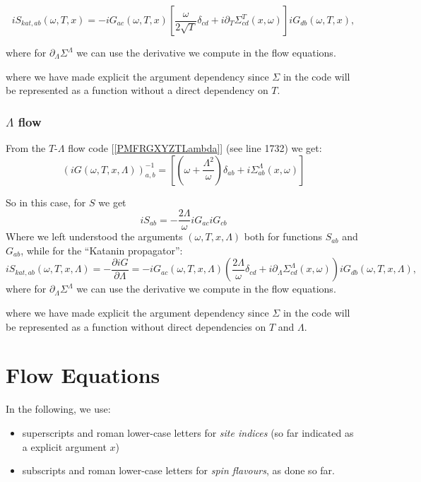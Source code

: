 \documentclass{article}
\begin{document}
\begin{equation}
  iS_{kat,ab}(\omega,T,x) = -iG_{ac}(\omega,T,x) \left[\frac{\omega}{2\sqrt{T}}\delta_{cd} + i\partial_T \Sigma^T_{cd}(x,\omega) \right]iG_{db}(\omega,T,x),
\end{equation}

where for $\partial_\Lambda \Sigma^\Lambda$ we can use the derivative we compute in the flow equations.



where we have made explicit the argument dependency
since $\Sigma$ in the code will be represented as a function
without a direct dependency on $T$.

\subsubsection{$\Lambda$ flow}

From the $T$-$\Lambda$ flow code [\ref{PMFRGXYZTLambda}] (see line 1732) we get:
\begin{equation}
  {(iG(\omega,T,x,\Lambda))}^{-1}_{a,b} = \left[\left(\omega+\frac{\Lambda^2}{\omega}\right) \delta_{ab} + i \Sigma^\Lambda_{ab}(x,\omega)\right]
\end{equation}

So in this case, for $S$ we get
\begin{equation}
iS_{ab} = - \frac{2\Lambda}{\omega} iG_{ac} iG_{cb}
\end{equation}
Where we left understood the arguments $(\omega,T,x,\Lambda)$ both for functions $S_{ab}$ and $G_{ab}$, while for the ``Katanin propagator'':
\begin{equation}
  iS_{kat,ab}(\omega,T,x,\Lambda) = - \frac{\partial iG}{\partial \Lambda} = - iG_{ac} (\omega,T,x,\Lambda)\left( \frac{2\Lambda}{\omega}\delta_{cd}  +i \partial_\Lambda \Sigma_{cd}^\Lambda(x,\omega)\right)iG_{db}(\omega,T,x,\Lambda),
\end{equation}
where for $\partial_\Lambda \Sigma^\Lambda$ we can use the derivative we compute in the flow equations.

where we have made explicit the argument dependency
since $\Sigma$ in the code will be represented as a function
without direct dependencies on $T$ and $\Lambda$.


\section{Flow Equations}

In the following, we use:
\begin{itemize}
\item superscripts and roman lower-case letters for \emph{site indices}
  (so far indicated as a explicit argument $x$)
\item subscripts and roman lower-case letters for \emph{spin flavours},
  as done so far.

\end{itemize}
\end{document}
